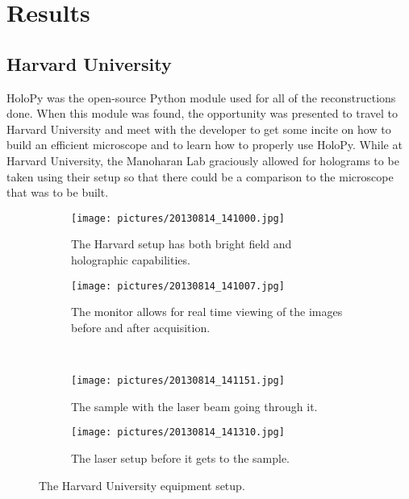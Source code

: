 %
%
%

\chapter{Results} \label{chap:Results}
\section{Harvard University}

HoloPy was the open-source Python module used for all of the reconstructions
done. When this module was found, the opportunity was presented to travel to
Harvard University and meet with the developer to get some incite on how to
build an efficient microscope and to learn how to properly use HoloPy. While at
Harvard University, the Manoharan Lab graciously allowed for holograms to be
taken using their setup so that there could be a comparison to the microscope
that was to be built.

\begin{figure}[ht!]
    \begin{center}

        \begin{subfigure}[t]{0.4\textwidth}
            \label{fig:second}
            \texttt{[image: pictures/20130814\_141000.jpg]}
            \caption{The Harvard setup has both bright field and holographic
            capabilities.}
        \end{subfigure}
                \hspace*{\fill}
        \begin{subfigure}[t]{0.4\textwidth}
            \label{fig:third}
            \texttt{[image: pictures/20130814\_141007.jpg]}
            \caption{The monitor allows for real time viewing of the images
            before and after acquisition.}
        \end{subfigure}
        \\

        \begin{subfigure}[t]{0.4\textwidth}
            \label{fig:fourth}
            \texttt{[image: pictures/20130814\_141151.jpg]}
            \caption{The sample with the laser beam going through it.}
        \end{subfigure}
        \hspace*{\fill}
        \begin{subfigure}[t]{0.4\textwidth}%
            \label{fig:fifth}
            \texttt{[image: pictures/20130814\_141310.jpg]}
            \caption{The laser setup before it gets to the sample.}
        \end{subfigure}

    \end{center}
    \caption{%
        The Harvard University equipment setup.
    }%
    \label{fig:harvardSetup}
\end{figure}

